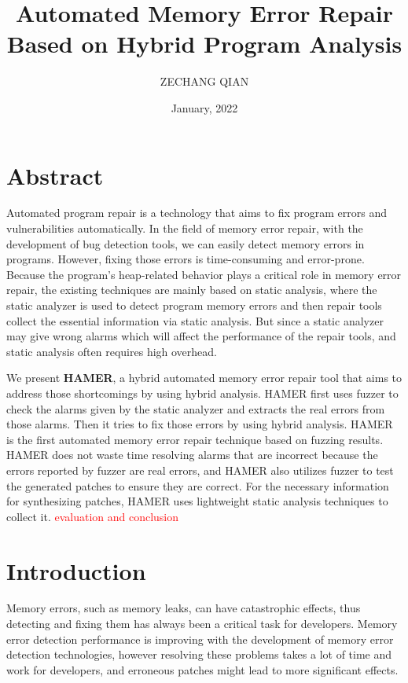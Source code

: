 \documentclass[a4paper,11pt,oneside,openany]{book}
\title{Automated Memory Error Repair\\Based on Hybrid Program Analysis}
\author{ZECHANG QIAN}
\affiliation{%
  Graduate Major in Computer Science\\
  School of Computing\\
  Tokyo Institute of Technology}
\date{January, 2022}
\begin{document}
\frontmatter
\maketitle

\chapter{Abstract}
Automated program repair is a technology that aims to fix program errors and vulnerabilities automatically. In the field of memory error repair, with the development of bug detection tools, we can easily detect memory errors in programs. However, fixing those errors is time-consuming and error-prone. Because the program’s heap-related behavior plays a critical role in memory error repair, the existing techniques are mainly based on static analysis, where the static analyzer is used to detect program memory errors and then repair tools collect the essential information via static analysis. But since a static analyzer may give wrong alarms which will affect the performance of the repair tools, and static analysis often requires high overhead. 

We present \textbf{HAMER}, a hybrid automated memory error repair tool that aims to address those 
shortcomings by using hybrid analysis. HAMER first uses fuzzer to check the alarms given by the static 
analyzer and extracts the real errors from those alarms. Then it tries to fix those errors by using 
hybrid analysis. HAMER is the first automated memory error repair technique based on fuzzing results. HAMER does not waste time resolving alarms that are incorrect because the errors reported by fuzzer are real errors, and HAMER also utilizes fuzzer to test the generated patches to ensure they are correct. For the necessary information for synthesizing patches, HAMER uses lightweight static analysis techniques to collect it. \textcolor{red}{evaluation and conclusion}


\tableofcontents
\listoffigures
\listoftables


\mainmatter
\chapter{Introduction}
Memory errors, such as memory leaks, can have catastrophic effects,  thus detecting and fixing them has always been a critical task for developers. Memory error detection performance is improving with the development of memory error detection technologies, however resolving these problems takes a lot of time and work for developers, and erroneous patches might lead to more significant effects.
\end{document}
